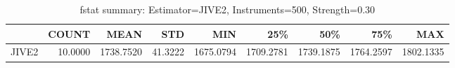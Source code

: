 \begin{table}[ht]
\centering
\caption{fstat summary: Estimator=JIVE2, Instruments=500, Strength=0.30}
\begin{tabular}{lrrrrrrrr}
\toprule
 & COUNT & MEAN & STD & MIN & 25\% & 50\% & 75\% & MAX \\
\midrule
JIVE2 & 10.0000 & 1738.7520 & 41.3222 & 1675.0794 & 1709.2781 & 1739.1875 & 1764.2597 & 1802.1335 \\
\bottomrule
\end{tabular}
\end{table}
